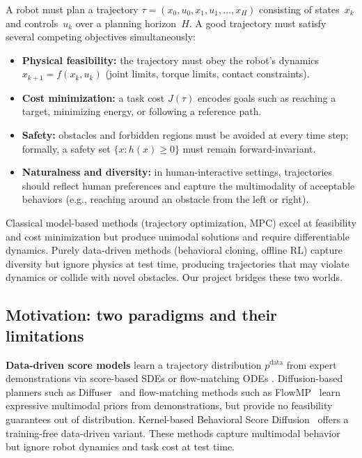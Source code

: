 \documentclass[11pt,letterpaper]{article}
\theoremstyle{plain}
\theoremstyle{definition}
\theoremstyle{remark}
\begin{document}
A robot must plan a trajectory $\tau=(x_0,u_0,x_1,u_1,\ldots,x_H)$
consisting of states~$x_k$ and controls~$u_k$ over a planning
horizon~$H$.  A good trajectory must satisfy several competing
objectives simultaneously:
\begin{itemize}[nosep]
  \item \textbf{Physical feasibility:} the trajectory must obey the
    robot's dynamics $x_{k+1}=f(x_k,u_k)$ (joint limits, torque limits,
    contact constraints).
  \item \textbf{Cost minimization:} a task cost $J(\tau)$ encodes goals
    such as reaching a target, minimizing energy, or following a
    reference path.
  \item \textbf{Safety:} obstacles and forbidden regions must be avoided
    at every time step; formally, a safety set
    $\{x:h(x)\ge 0\}$ must remain forward-invariant.
  \item \textbf{Naturalness and diversity:} in human-interactive
    settings, trajectories should reflect human preferences and capture
    the multimodality of acceptable behaviors (e.g., reaching around an
    obstacle from the left or right).
\end{itemize}
Classical model-based methods (trajectory optimization, MPC) excel at
feasibility and cost minimization but produce unimodal solutions and
require differentiable dynamics.  Purely data-driven methods
(behavioral cloning, offline RL) capture diversity but ignore physics
at test time, producing trajectories that may violate dynamics or
collide with novel obstacles.  Our project bridges these two worlds.

\subsection{Motivation: two paradigms and their limitations}

\textbf{Data-driven score models} learn a trajectory distribution
$p^{\mathrm{data}}$ from expert demonstrations via score-based SDEs
\citep{song2021score} or flow-matching ODEs
\citep{lipman2023flow,chi2023diffusionpolicy,janner2022}.
Diffusion-based planners such as Diffuser~\citep{janner2022} and
flow-matching methods such as FlowMP~\citep{flowmp} learn expressive
multimodal priors from demonstrations, but provide no feasibility
guarantees out of distribution.  Kernel-based Behavioral Score
Diffusion~\citep{bsd} offers a training-free data-driven variant.
These methods capture multimodal behavior but ignore robot dynamics and
task cost at test time.
\end{document}
